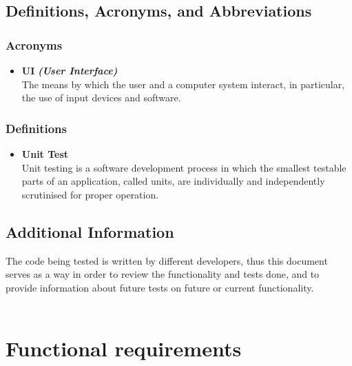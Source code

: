 \documentclass[12pt]{article}
\begin{document}
{		\subsection{Definitions, Acronyms, and Abbreviations}


			\subsubsection{Acronyms}

			\begin{itemize}

				\item \textbf{UI} \textbf{\textit{(User Interface)}} \\
				\newline
				The means by which the user and a computer system interact, in particular, the use of input devices and software.

			\end{itemize}

			\subsubsection{Definitions}

			\begin{itemize}

				\item \textbf{Unit Test}\\
				\newline
				Unit testing is a software development process in which the smallest testable parts of an application, called units, are individually and independently scrutinised for proper operation.\\

			\end{itemize}

		\subsection{Additional Information}

		The code being tested is written by different developers, thus this document serves as a way in order to review the functionality and tests done, and to provide information about future tests on future or current functionality.\\\\


	\pagebreak
	\section{Functional requirements}
}
\end{document}
